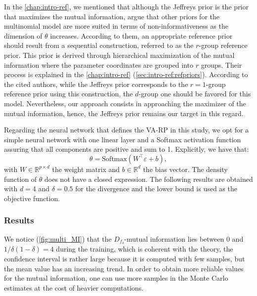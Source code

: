 In the \cref{chap:intro-ref}, we mentioned that
although the Jeffreys prior is the prior that maximizes the mutual information, \citet{berger_ordered_1992,berger_overall_2015} argue that other priors for the multinomial model are more suited in terms of non-informativeness as the dimension of $\theta$ increases. {According to them, an appropriate reference prior should result from a sequential construction}, referred to as the $r$-group reference prior. This prior is derived through hierarchical maximization of the mutual information where the parameter coordinates are grouped into $r$ groups. Their process is explained in the \cref{chap:intro-ref} (\cref{sec:intro-ref:refpriors}). According to the cited authors, while the Jeffreys prior corresponds to the $r=1$-group reference prior using this construction, the $d$-group one should be favored for this model. 
Nevertheless, our approach consists in approaching the maximizer of the mutual information, hence, the Jeffreys prior remains our target in this regard.




Regarding the neural network that defines the VA-RP in this study, we opt for a simple neural network with one linear layer and a Softmax activation function assuring that all components are positive and sum to 1. Explicitly, we have that: 
\begin{equation}
    \theta = \text{Softmax}(W^{\top}\varepsilon + b),
\end{equation}
with $W \in \mathbb{R}^{p\times d}$ the weight matrix and $b \in \mathbb{R}^d$ the bias vector. The density function of $\theta$ does not have a closed expression. The following results are obtained with $d=4$ and $\delta=0.5$ for the divergence and the lower bound is used as the objective function.



\subsubsection{Results}



We notice (\cref{fig:multi_MI}) that the $D_{f_\delta}$-mutual information lies between $0$ and $1/\delta(1-\delta) = 4$ during the training, which is coherent with the theory, the confidence interval is rather large because it is computed with few samples, but the mean value has an increasing trend. {In order to obtain more reliable values for the mutual information, one can use more samples in the Monte Carlo estimates at the cost of heavier computations.}

